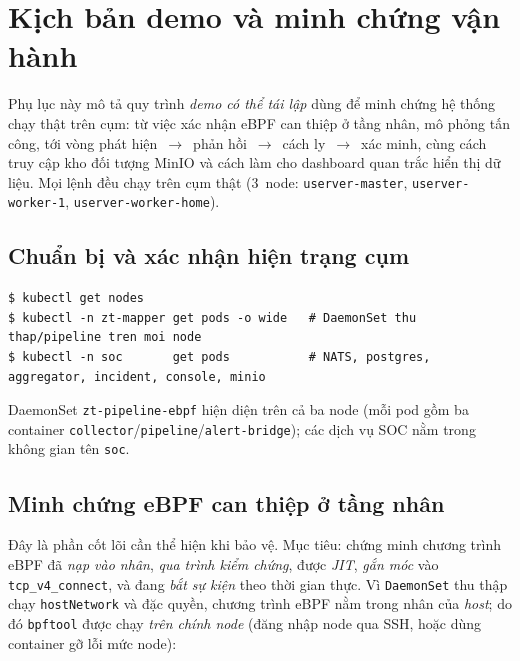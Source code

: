 \chapter{Kịch bản demo và minh chứng vận hành}
\label{app:demo}

Phụ lục này mô tả quy trình \emph{demo có thể tái lập} dùng để minh chứng hệ thống chạy
thật trên cụm: từ việc xác nhận eBPF can thiệp ở tầng nhân, mô phỏng tấn công, tới vòng
phát hiện~$\rightarrow$~phản hồi~$\rightarrow$~cách ly~$\rightarrow$~xác minh, cùng cách
truy cập kho đối tượng MinIO và cách làm cho dashboard quan trắc hiển thị dữ liệu. Mọi
lệnh đều chạy trên cụm thật ($3$~node: \texttt{userver-master}, \texttt{userver-worker-1},
\texttt{userver-worker-home}).

\section{Chuẩn bị và xác nhận hiện trạng cụm}

\begin{lstlisting}[language={},caption={Xác nhận node và các pod thành phần đang chạy.}]
$ kubectl get nodes
$ kubectl -n zt-mapper get pods -o wide   # DaemonSet thu thap/pipeline tren moi node
$ kubectl -n soc       get pods           # NATS, postgres, aggregator, incident, console, minio
\end{lstlisting}

DaemonSet \texttt{zt-pipeline-ebpf} hiện diện trên cả ba node (mỗi pod gồm ba container
\texttt{collector}/\texttt{pipeline}/\texttt{alert-bridge}); các dịch vụ SOC nằm trong
không gian tên \texttt{soc}.

\section{Minh chứng eBPF can thiệp ở tầng nhân}
\label{app:demo-ebpf}

Đây là phần cốt lõi cần thể hiện khi bảo vệ. Mục tiêu: chứng minh chương trình eBPF đã
\emph{nạp vào nhân}, \emph{qua trình kiểm chứng}, được \emph{JIT}, \emph{gắn móc} vào
\texttt{tcp\_v4\_connect}, và đang \emph{bắt sự kiện} theo thời gian thực. Vì
\texttt{DaemonSet} thu thập chạy \texttt{hostNetwork} và đặc quyền, chương trình eBPF nằm
trong nhân của \emph{host}; do đó \texttt{bpftool} được chạy \emph{trên chính node} (đăng
nhập node qua SSH, hoặc dùng container gỡ lỗi mức node):

